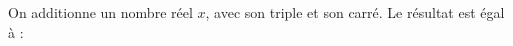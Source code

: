 
On additionne un nombre réel $x$, avec son triple et son carré. Le résultat est égal à :

\smallskip

